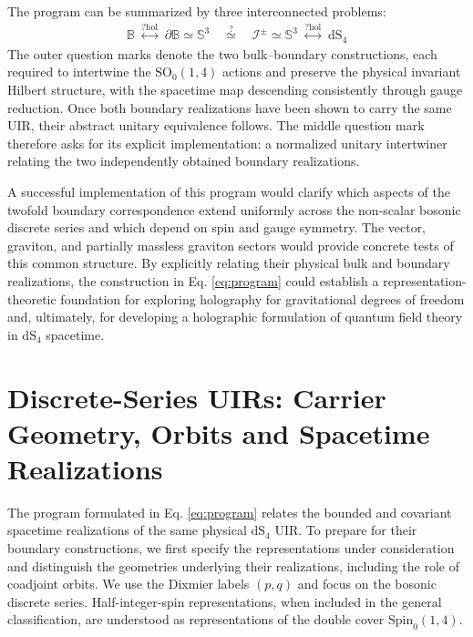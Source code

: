 \documentclass{SciPost}
\begin{document}
The program can be summarized by three interconnected problems:
\begin{align} \label{eq:program}
    \boxed{
        \mathbb{B} \;\overset{?\mathrm{hol}}{\longleftrightarrow}\; \partial\mathbb{B} \simeq \mathbb{S}^{3}
        \quad\overset{?}{\simeq}\quad
        \mathscr{I}^{\pm} \simeq \mathbb{S}^{3}
        \;\overset{?\mathrm{hol}}{\longleftrightarrow}\; \mathrm{dS}_{4}
        }
\end{align}
The outer question marks denote the two bulk--boundary constructions, each required to intertwine the $\mathrm{SO}_0(1,4)$ actions and preserve the physical invariant Hilbert structure, with the spacetime map descending consistently through gauge reduction. Once both boundary realizations have been shown to carry the same UIR, their abstract unitary equivalence follows. The middle question mark therefore asks for its explicit implementation: a normalized unitary intertwiner relating the two independently obtained boundary realizations.

A successful implementation of this program would clarify which aspects of the twofold boundary correspondence extend uniformly across the non-scalar bosonic discrete series and which depend on spin and gauge symmetry. The vector, graviton, and partially massless graviton sectors would provide concrete tests of this common structure. By explicitly relating their physical bulk and boundary realizations, the construction in Eq. \eqref{eq:program} could establish a representation-theoretic foundation for exploring holography for gravitational degrees of freedom and, ultimately, for developing a holographic formulation of quantum field theory in $\mathrm{dS}_{4}$ spacetime.


\section{Discrete-Series UIRs: Carrier Geometry, Orbits and Spacetime Realizations} \label{sec:discrete-realizations}

The program formulated in Eq. \eqref{eq:program} relates the bounded and covariant spacetime realizations of the same physical $\mathrm{dS}_{4}$ UIR. To prepare for their boundary constructions, we first specify the representations under consideration and distinguish the geometries underlying their realizations, including the role of coadjoint orbits. We use the Dixmier labels $(p,q)$ \cite{Dixmier} and focus on the bosonic discrete series. Half-integer-spin representations, when included in the general classification, are understood as representations of the double cover $\mathrm{Spin}_0(1,4)$.
\end{document}
